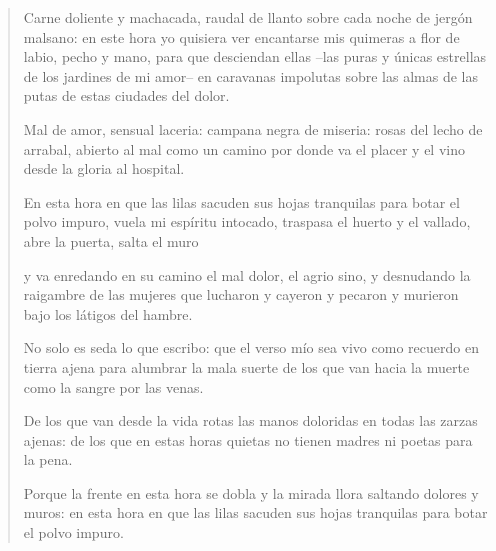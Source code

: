 \documentclass[12pt]{article}
\begin{document}
\clearpage
{}
\begin{verse}
Carne doliente y machacada,  
raudal de llanto sobre cada  
noche de jergón malsano:  
en este hora yo quisiera  
ver encantarse mis quimeras  
a flor de labio, pecho y mano,  
para que desciendan ellas  
--las puras y únicas estrellas  
de los jardines de mi amor--  
en caravanas impolutas  
sobre las almas de las putas  
de estas ciudades del dolor.  
	
Mal de amor, sensual laceria:  
campana negra de miseria:  
rosas del lecho de arrabal,  
abierto al mal como un camino  
por donde va el placer y el vino  
desde la gloria al hospital.  
	
En esta hora en que las lilas  
sacuden sus hojas tranquilas  
para botar el polvo impuro,  
vuela mi espíritu intocado,  
traspasa el huerto y el vallado,  
abre la puerta, salta el muro  
	
y va enredando en su camino  
el mal dolor, el agrio sino,  
y desnudando la raigambre  
de las mujeres que lucharon  
y cayeron  
y pecaron  
y murieron  
bajo los látigos del hambre.  
	
No solo es seda lo que escribo:  
que el verso mío sea vivo  
como recuerdo en tierra ajena  
para alumbrar la mala suerte  
de los que van hacia la muerte  
como la sangre por las venas.  
	
De los que van desde la vida  
rotas las manos doloridas  
en todas las zarzas ajenas:  
de los que en estas horas quietas  
no tienen madres ni poetas  
para la pena.  
	
Porque la frente en esta hora  
se dobla y la mirada llora  
saltando dolores y muros:  
en esta hora en que las lilas  
sacuden sus hojas tranquilas  
para botar el polvo impuro.

\end{verse}
\end{document}
